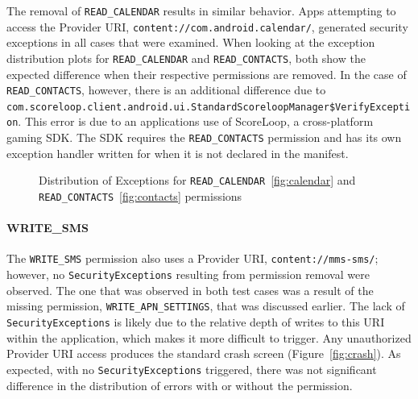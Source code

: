 The removal of \texttt{READ\_CALENDAR} results in similar behavior. Apps attempting to access the Provider URI, \texttt{content://com.android.calendar/}, generated security exceptions in all cases that were examined.  When looking at the exception distribution plots for \texttt{READ\_CALENDAR} and \texttt{READ\_CONTACTS}, both show the expected difference when their respective permissions are removed.  In the case of \texttt{READ\_CONTACTS}, however, there is an additional difference due to \texttt{com.scoreloop.client.android.ui.StandardScoreloopManager\$VerifyException}.  This error is due to an applications use of ScoreLoop, a cross-platform gaming SDK.  The SDK requires the \texttt{READ\_CONTACTS} permission and has its own exception handler written for when it is not declared in the manifest.

\begin{figure}[h!]
\hfill
{}
\hfill
{}
\hfill
\caption{Distribution of Exceptions for \texttt{READ\_CALENDAR}~\ref{fig:calendar} and \texttt{READ\_CONTACTS}~\ref{fig:contacts} permissions}
\end{figure}

\paragraph{\bfseries \ttfamily WRITE\_SMS}
The \texttt{WRITE\_SMS} permission also uses a Provider URI, \texttt{content://mms-sms/}; however, no \texttt{SecurityExceptions} resulting from permission removal were observed.  The one that was observed in both test cases was a result of the missing permission, \texttt{WRITE\_APN\_SETTINGS}, that was discussed earlier.  The lack of \texttt{SecurityExceptions} is likely due to the relative depth of writes to this URI within the application, which makes it more difficult to trigger.  Any unauthorized Provider URI access produces the standard crash screen (Figure~\ref{fig:crash}).  As expected, with no \texttt{SecurityExceptions} triggered, there was not significant difference in the distribution of errors with or without the permission. 

